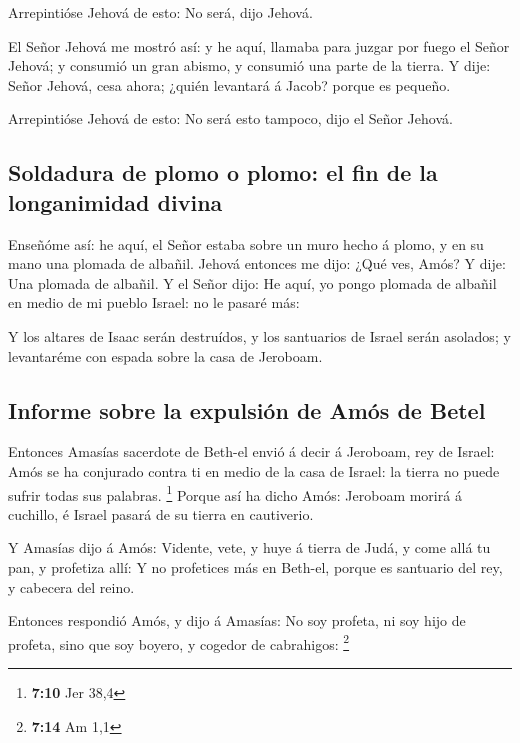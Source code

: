  Arrepintióse Jehová de esto: No será, dijo Jehová.

 El Señor Jehová me mostró así: y he aquí, llamaba para
juzgar por fuego el Señor Jehová; y consumió un gran abismo, y consumió
una parte de la tierra.  Y dije: Señor Jehová, cesa ahora;
¿quién levantará á Jacob? porque es pequeño.

 Arrepintióse Jehová de esto: No será esto tampoco, dijo el
Señor Jehová.

\hypertarget{soldadura-de-plomo-o-plomo-el-fin-de-la-longanimidad-divina}{%
\subsection{Soldadura de plomo o plomo: el fin de la longanimidad
divina}\label{soldadura-de-plomo-o-plomo-el-fin-de-la-longanimidad-divina}}

 Enseñóme así: he aquí, el Señor estaba sobre un muro hecho
á plomo, y en su mano una plomada de albañil.  Jehová
entonces me dijo: ¿Qué ves, Amós? Y dije: Una plomada de albañil. Y el
Señor dijo: He aquí, yo pongo plomada de albañil en medio de mi pueblo
Israel: no le pasaré más:

 Y los altares de Isaac serán destruídos, y los santuarios
de Israel serán asolados; y levantaréme con espada sobre la casa de
Jeroboam.

\hypertarget{informe-sobre-la-expulsiuxf3n-de-amuxf3s-de-betel}{%
\subsection{Informe sobre la expulsión de Amós de
Betel}\label{informe-sobre-la-expulsiuxf3n-de-amuxf3s-de-betel}}

 Entonces Amasías sacerdote de Beth-el envió á decir á
Jeroboam, rey de Israel: Amós se ha conjurado contra ti en medio de la
casa de Israel: la tierra no puede sufrir todas sus palabras.
\footnote{\textbf{7:10} Jer 38,4}  Porque así ha dicho
Amós: Jeroboam morirá á cuchillo, é Israel pasará de su tierra en
cautiverio.

 Y Amasías dijo á Amós: Vidente, vete, y huye á tierra de
Judá, y come allá tu pan, y profetiza allí:  Y no
profetices más en Beth-el, porque es santuario del rey, y cabecera del
reino.

 Entonces respondió Amós, y dijo á Amasías: No soy profeta,
ni soy hijo de profeta, sino que soy boyero, y cogedor de cabrahigos:
\footnote{\textbf{7:14} Am 1,1}

